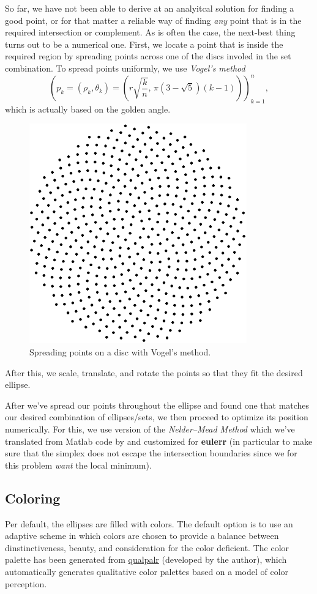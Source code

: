 \documentclass[
  headsepline=true,headings=standardclasses%
]{scrartcl}
\theoremstyle{definition}
\theoremstyle{definition}
\theoremstyle{definition}
\theoremstyle{remark}
\begin{document}
So far, we have not been able to derive at an analyitcal solution for
finding a good point, or for that matter a reliable way of finding
\emph{any} point that is in the required intersection or complement. As
is often the case, the next-best thing turns out to be a numerical one.
First, we locate a point that is inside the required region by spreading
points across one of the discs involed in the set combination. To spread
points uniformly, we use \emph{Vogel's method}
\autocites{arthur_2015}{vogel_1979} \[
\left( p_k = (\rho_k, \theta_k) = \left( r \sqrt{\frac{k}{n}},\, \pi (3 - \sqrt{5})(k - 1) \right) \right)_{k=1}^n,
\] which is actually based on the golden angle.

\begin{figure}
\centering
\includegraphics{thesis_files/figure-latex/unnamed-chunk-7-1.pdf}
\caption{\label{fig:unnamed-chunk-7}Spreading points on a disc with Vogel's
method.}
\end{figure}

After this, we scale, translate, and rotate the points so that they fit
the desired ellipse.

After we've spread our points throughout the ellipse and found one that
matches our desired combination of ellipses/sets, we then proceed to
optimize its position numerically. For this, we use version of the
\emph{Nelder--Mead Method} \autocite{nelder_1965} which we've translated
from Matlab code by \textcite{kelley_1999} and customized for
\textbf{eulerr} (in particular to make sure that the simplex does not
escape the intersection boundaries since we for this problem \emph{want}
the local minimum).

\subsection{Coloring}\label{coloring}

Per default, the ellipses are filled with colors. The default option is
to use an adaptive scheme in which colors are chosen to provide a
balance between dinstinctiveness, beauty, and consideration for the
color deficient. The color palette has been generated from
\href{https://CRAN.R-project.org/package=qualpalr}{qualpalr} (developed
by the author), which automatically generates qualitative color palettes
based on a model of color perception.

\printbibliography[title=References]
\end{document}
